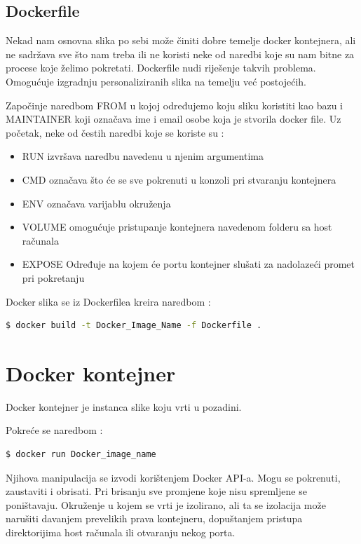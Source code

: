 \documentclass[times, utf8, zavrsni]{fer}
\begin{document}
\subsection{Dockerfile}
Nekad nam osnovna slika po sebi može činiti dobre temelje docker kontejnera, ali ne sadržava sve što nam treba ili ne koristi neke od naredbi koje su nam bitne za procese koje želimo pokretati. Dockerfile nudi riješenje takvih problema. Omogućuje izgradnju personaliziranih slika na temelju već postojećih. 

Započinje naredbom FROM u kojoj određujemo koju sliku koristiti kao bazu i MAINTAINER koji označava ime i email osobe koja je stvorila docker file.
Uz početak, neke od čestih naredbi koje se koriste su :
\begin{itemize}
\item{RUN}
 izvršava naredbu navedenu u njenim argumentima
\item{CMD}
 označava što će se sve pokrenuti u konzoli pri stvaranju kontejnera
\item{ENV}
označava varijablu okruženja
\item{VOLUME}
omogućuje pristupanje kontejnera navedenom folderu sa host računala
\item{EXPOSE}
Određuje na kojem će portu kontejner slušati za nadolazeći promet pri pokretanju
\end{itemize}

Docker slika se iz Dockerfilea kreira naredbom : 
\begin{lstlisting}[language=bash, basicstyle=\footnotesize]
  $ docker build -t Docker_Image_Name -f Dockerfile .
\end{lstlisting}

\section{Docker kontejner}
Docker kontejner je instanca slike koju vrti u pozadini.

Pokreće se naredbom :
\begin{lstlisting}[language=bash, basicstyle=\footnotesize]
  $ docker run Docker_image_name
\end{lstlisting}

Njihova manipulacija se izvodi korištenjem Docker API-a. Mogu se pokrenuti, zaustaviti i obrisati. Pri brisanju sve promjene koje nisu spremljene se poništavaju.
Okruženje u kojem se vrti je izolirano, ali ta se izolacija može narušiti davanjem prevelikih prava kontejneru, dopuštanjem pristupa direktorijima host računala ili otvaranju nekog porta.
\end{document}
